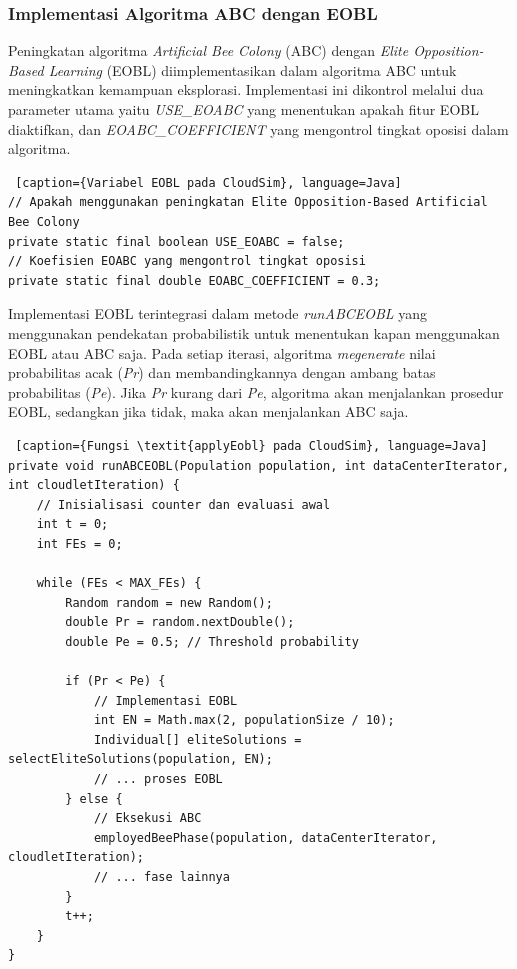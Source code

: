 \subsubsection{Implementasi Algoritma ABC dengan EOBL}
Peningkatan algoritma \textit{Artificial Bee Colony} (ABC) dengan \textit{Elite Opposition-Based Learning} (EOBL) diimplementasikan dalam algoritma ABC untuk meningkatkan kemampuan eksplorasi. Implementasi ini dikontrol melalui dua parameter utama yaitu \textit{USE\_EOABC} yang menentukan apakah fitur EOBL diaktifkan, dan \textit{EOABC\_COEFFICIENT} yang mengontrol tingkat oposisi dalam algoritma.

\begin{lstlisting} [caption={Variabel EOBL pada CloudSim}, language=Java]
// Apakah menggunakan peningkatan Elite Opposition-Based Artificial Bee Colony
private static final boolean USE_EOABC = false; 
// Koefisien EOABC yang mengontrol tingkat oposisi
private static final double EOABC_COEFFICIENT = 0.3;
\end{lstlisting}

Implementasi EOBL terintegrasi dalam metode \textit{runABCEOBL} yang menggunakan pendekatan probabilistik untuk menentukan kapan menggunakan EOBL atau ABC saja. Pada setiap iterasi, algoritma \textit{megenerate} nilai probabilitas acak (\textit{Pr}) dan membandingkannya dengan ambang batas probabilitas (\textit{Pe}). Jika \textit{Pr} kurang dari \textit{Pe}, algoritma akan menjalankan prosedur EOBL, sedangkan jika tidak, maka akan menjalankan ABC saja.

\begin{lstlisting} [caption={Fungsi \textit{applyEobl} pada CloudSim}, language=Java]
private void runABCEOBL(Population population, int dataCenterIterator, int cloudletIteration) {
    // Inisialisasi counter dan evaluasi awal
    int t = 0;
    int FEs = 0;
    
    while (FEs < MAX_FEs) {
        Random random = new Random();
        double Pr = random.nextDouble();
        double Pe = 0.5; // Threshold probability
        
        if (Pr < Pe) {
            // Implementasi EOBL
            int EN = Math.max(2, populationSize / 10);
            Individual[] eliteSolutions = selectEliteSolutions(population, EN);
            // ... proses EOBL
        } else {
            // Eksekusi ABC
            employedBeePhase(population, dataCenterIterator, cloudletIteration);
            // ... fase lainnya
        }
        t++;
    }
}
\end{lstlisting}

